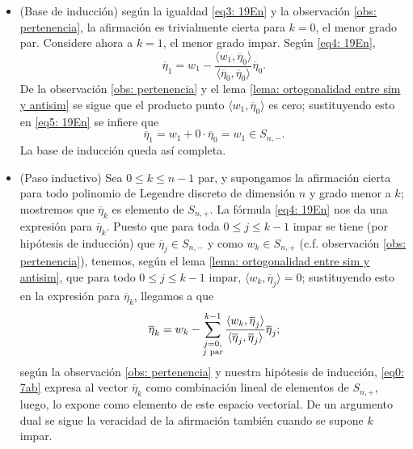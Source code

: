 \begin{itemize}

\item (Base de inducción) según la igualdad
\eqref{eq3: 19En} y la observación 
\ref{obs: pertenencia}, la afirmación 
es trivialmente cierta para $k=0$, el menor grado par.
Considere ahora a $k=1$, el menor grado impar. Según 
\eqref{eq4: 19En}, 
\begin{equation}
\label{eq5: 19En}
\overline{\eta}_{1}= w_{1}
- \frac{\langle w_{1}, \overline{\eta}_{0} \rangle}
{\langle \overline{\eta}_{0}, \overline{\eta}_{0} \rangle}\overline{\eta}_{0}.
\end{equation}
De la observación 
\ref{obs: pertenencia} y el lema
\ref{lema: ortogonalidad entre sim y antisim} se sigue
que el producto punto $\langle w_{1}, \overline{\eta}_{0} \rangle$
es cero; sustituyendo esto en \eqref{eq5: 19En}
se infiere que 
\[
\overline{\eta}_{1} = w_{1} + 0 \cdot \overline{\eta}_{0}=
w_{1} \in S_{n,-}.
\]
La base de inducción queda así completa.

\item (Paso inductivo) Sea $0 \leq k \leq n-1$ par, y
supongamos la afirmación cierta para todo polinomio de Legendre
discreto de dimensión $n$ y grado menor a $k$;
mostremos que $\overline{\eta}_{k}$ es elemento de $S_{n,+}$.
La fórmula \eqref{eq4: 19En} nos da una expresión
para $\overline{\eta}_{k}$.
Puesto que
para toda $0 \leq j \leq k-1$ impar se tiene 
(por hipótesis de inducción) 
que $\overline{\eta}_{j} \in S_{n,-}$
y como $w_{k} \in S_{n,+}$ (c.f. observación 
\ref{obs: pertenencia}), tenemos, según el lema
\ref{lema: ortogonalidad entre sim y antisim}, que
para todo $0 \leq j \leq k-1$ impar, 
$\langle w_{k}, \overline{\eta}_{j} \rangle=0$;
sustituyendo esto en la expresión para 
$\overline{\eta}_{k}$, llegamos a que
\begin{equation}
\label{eq0: 7ab}
\overline{\eta}_{k}= w_{k}-
\sum\limits_{
\substack{ {j=0}, \\  {j\text{ par}}}
}^{k-1}
\frac{\langle w_{k}, \overline{\eta}_{j} \rangle}
{\langle \overline{\eta}_{j}, \overline{\eta}_{j} \rangle}\overline{\eta}_{j}
;
\end{equation}
según la observación \ref{obs: pertenencia}
y nuestra hipótesis de inducción, 
\eqref{eq0: 7ab} expresa al vector 
$\overline{\eta}_{k}$ como combinación lineal
de elementos de $S_{n,+}$, luego, lo expone como
elemento de este espacio vectorial. De un argumento
dual se sigue la veracidad de la afirmación también
cuando se supone $k$ impar.
\end{itemize}
\QEDB
\vspace{0.2cm}


